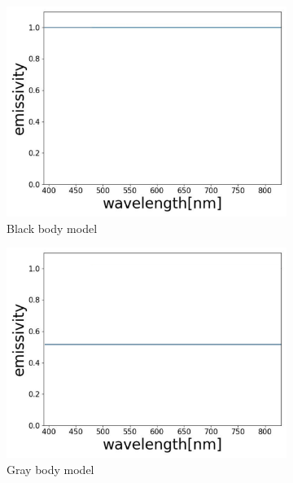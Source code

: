 \begin{figure}[htbp]
    \centering
    \begin{subfigure}{0.3\linewidth}
      \centering
      \includegraphics[width=\linewidth]{figures/emissivity_0.jpg}
      \caption{Black body model}
      \label{fig: emi_0}
    \end{subfigure}
    \hfill
    \begin{subfigure}{0.3\linewidth}
      \centering
      \includegraphics[width=\linewidth]{figures/emissivity_1.jpg}
      \caption{Gray body model}
      \label{fig: emi_1}
    \end{subfigure}
    \hfill
    \begin{subfigure}{0.3\linewidth}
      \centering

\end{subfigure}
\end{figure}

